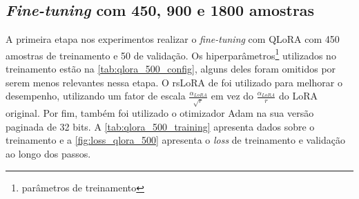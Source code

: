 \subsection{\textit{Fine-tuning} com 450, 900 e 1800 amostras}


A primeira etapa nos experimentos realizar o \textit{fine-tuning} com \ac{QLoRA} com 450 amostras de treinamento e 50
de validação. Os hiperparâmetros\footnote{parâmetros de treinamento} utilizados no treinamento estão na
\autoref{tab:qlora_500_config}, alguns deles foram omitidos por serem menos relevantes nessa etapa. O \ac{rsLoRA} de
\textcite{kalajdzievski2023rank} foi utilizado para melhorar o desempenho, utilizando um fator de escala \begin{math}\frac{\alpha_{LoRA}}{\sqrt{r}}\end{math} em vez do
\begin{math}\frac{\alpha_{LoRA}}{r}\end{math} do \ac{LoRA} original. Por fim, também foi utilizado o otimizador \ac{Adam} na sua versão paginada de 32 bits. A
\autoref{tab:qlora_500_training} apresenta dados sobre o treinamento e a \autoref{fig:loss_qlora_500} apresenta o \textit{loss} de treinamento e validação ao longo dos
passos.

